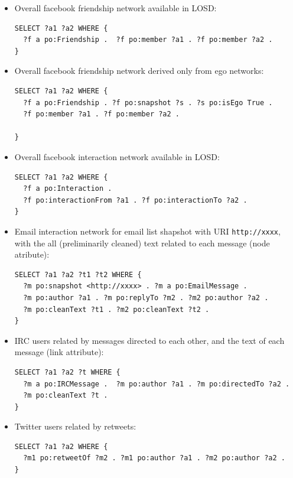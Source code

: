 \documentclass[journal,article,submit,moreauthors,pdftex]{Definitions/mdpi}
\begin{document}
\begin{itemize}
  \item Overall facebook friendship network available in LOSD:
\begin{lstlisting}[language=spq]
SELECT ?a1 ?a2 WHERE { 
  ?f a po:Friendship .  ?f po:member ?a1 . ?f po:member ?a2 .
}
\end{lstlisting}\vspace{-0.2cm}
  \item Overall facebook friendship network derived only from ego networks:
\begin{lstlisting}[language=spq]
SELECT ?a1 ?a2 WHERE { 
  ?f a po:Friendship . ?f po:snapshot ?s . ?s po:isEgo True .
  ?f po:member ?a1 . ?f po:member ?a2 .

}
\end{lstlisting}\vspace{-0.2cm}
  \item Overall facebook interaction network available in LOSD:
\begin{lstlisting}[language=spq]
SELECT ?a1 ?a2 WHERE { 
  ?f a po:Interaction .
  ?f po:interactionFrom ?a1 . ?f po:interactionTo ?a2 .
}
\end{lstlisting}\vspace{-0.2cm}
  \item Email interaction network for email list shapshot with URI \verb|http://xxxx|, with the all (preliminarily cleaned) text related to each message (node atribute):
\begin{lstlisting}[language=spq]
SELECT ?a1 ?a2 ?t1 ?t2 WHERE { 
  ?m po:snapshot <http://xxxx> . ?m a po:EmailMessage .
  ?m po:author ?a1 . ?m po:replyTo ?m2 . ?m2 po:author ?a2 .
  ?m po:cleanText ?t1 . ?m2 po:cleanText ?t2 .
}
\end{lstlisting}\vspace{-0.2cm}
  \item IRC users related by messages directed to each other, and the text of each message (link attribute):
\begin{lstlisting}[language=spq]
SELECT ?a1 ?a2 ?t WHERE { 
  ?m a po:IRCMessage .  ?m po:author ?a1 . ?m po:directedTo ?a2 .
  ?m po:cleanText ?t .
}
\end{lstlisting}\vspace{-0.2cm}
  \item Twitter users related by retweets:
\begin{lstlisting}[language=spq]
SELECT ?a1 ?a2 WHERE { 
  ?m1 po:retweetOf ?m2 . ?m1 po:author ?a1 . ?m2 po:author ?a2 .
}
\end{lstlisting}\vspace{-0.2cm}

\end{itemize}
\end{document}
